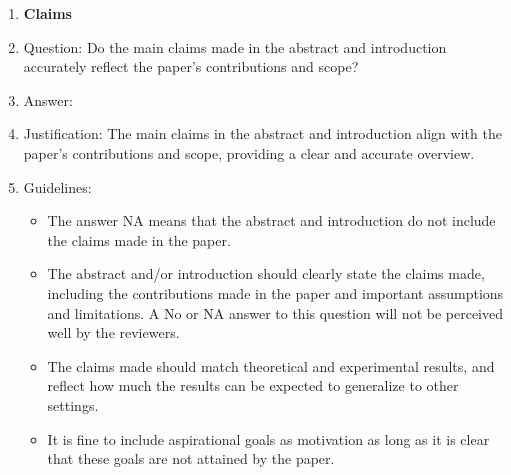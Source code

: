 \documentclass{article}
\begin{document}
\begin{enumerate}

\item {\bf Claims}
    \item[] Question: Do the main claims made in the abstract and introduction accurately reflect the paper's contributions and scope?
    \item[] Answer: \answerYes{} %
    \item[] Justification: The main claims in the abstract and introduction align with the paper's contributions and scope, providing a clear and accurate overview.
    \item[] Guidelines: 
    \begin{itemize}
        \item The answer NA means that the abstract and introduction do not include the claims made in the paper.
        \item The abstract and/or introduction should clearly state the claims made, including the contributions made in the paper and important assumptions and limitations. A No or NA answer to this question will not be perceived well by the reviewers. 
        \item The claims made should match theoretical and experimental results, and reflect how much the results can be expected to generalize to other settings. 
        \item It is fine to include aspirational goals as motivation as long as it is clear that these goals are not attained by the paper. 
    \end{itemize}


\end{enumerate}
\end{document}
